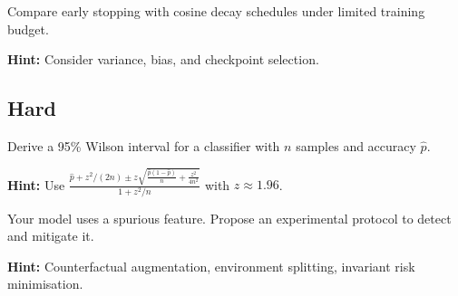 \begin{problem}
Compare early stopping with cosine decay schedules under limited training budget.

\textbf{Hint:} Consider variance, bias, and checkpoint selection.
\end{problem}

\subsection*{Hard}

\begin{problem}
Derive a 95\% Wilson interval for a classifier with $n$ samples and accuracy $\hat{p}$.

\textbf{Hint:} Use $\frac{\hat{p}+z^2/(2n) \pm z\sqrt{\frac{\hat{p}(1-\hat{p})}{n}+\frac{z^2}{4n^2}}}{1+z^2/n}$ with $z\approx1.96$.
\end{problem}

\begin{problem}
Your model uses a spurious feature. Propose an experimental protocol to detect and mitigate it.

\textbf{Hint:} Counterfactual augmentation, environment splitting, invariant risk minimisation.
\end{problem}


